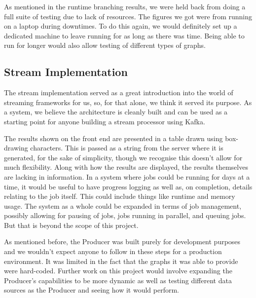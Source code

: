As mentioned in the runtime branching results, we were held back from doing a
full suite of testing due to lack of resources. The figures we got were from
running on a laptop during downtimes. To do this again, we would definitely set
up a dedicated machine to leave running for as long as there was time. Being
able to run for longer would also allow testing of different types of graphs.

\subsection{Stream Implementation}

The stream implementation served as a great introduction into the world of
streaming frameworks for us, so, for that alone, we think it served its
purpose. As a system, we believe the architecture is cleanly built and can be
used as a starting point for anyone building a stream processor using Kafka.

The results shown on the front end are presented in a table drawn using
box-drawing characters. This is passed as a string from the server where it is
generated, for the sake of simplicity, though we recognise this doesn't allow
for much flexibility. Along with how the results are displayed, the results
themselves are lacking in information. In a system where jobs could be running
for days at a time, it would be useful to have progress logging as well as, on
completion, details relating to the job itself. This could include things like
runtime and memory usage. The system as a whole could be expanded in terms of
job management, possibly allowing for pausing of jobs, jobs running in
parallel, and queuing jobs. But that is beyond the scope of this project.

As mentioned before, the Producer was built purely for development purposes and
we wouldn't expect anyone to follow in these steps for a production
environment. It was limited in the fact that the graphs it was able to provide
were hard-coded. Further work on this project would involve expanding the
Producer's capabilities to be more dynamic as well as testing different data
sources as the Producer and seeing how it would perform.

